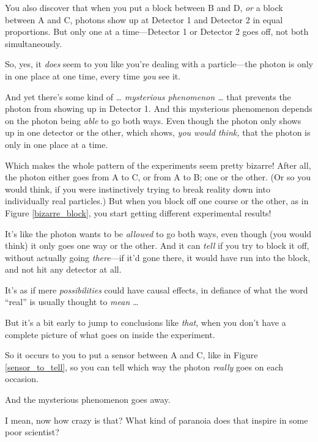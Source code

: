 {
 You also discover that when you put a block between B and D,
\textit{or} a block between A and C, photons show up at Detector 1 and
Detector 2 in equal proportions. But only one at a time---Detector 1 or
Detector 2 goes off, not both simultaneously.}

{
 So, yes, it \textit{does} seem to you like you're
dealing with a particle---the photon is only in one place at one time,
every time \textit{you} see it.}

{
 And yet there's some kind of \ldots
\textit{mysterious phenomenon \ldots} that prevents the photon from
showing up in Detector 1. And this mysterious phenomenon depends on the
photon being \textit{able} to go both ways. Even though the photon only
shows up in one detector or the other, which shows, \textit{you would
think,} that the photon is only in one place at a time.}


{
 Which makes the whole pattern of the experiments seem pretty
bizarre! After all, the photon either goes from A to C, or from A to B;
one or the other. (Or so you would think, if you were instinctively
trying to break reality down into individually real particles.) But
when you block off one course or the other, as in Figure \ref{bizarre_block}, you
start getting different experimental results!}

{
 It's like the photon wants to be \textit{allowed}
to go both ways, even though (you would think) it only goes one way or
the other. And it can \textit{tell} if you try to block it off, without
actually going \textit{there}{}---if it'd gone there,
it would have run into the block, and not hit any detector at all.}

{
 It's as if mere \textit{possibilities} could have
causal effects, in defiance of what the word
``real'' is usually thought to
\textit{mean} \ldots}

{
 But it's a bit early to jump to conclusions like
\textit{that}, when you don't have a complete picture
of what goes on inside the experiment.}


{
 So it occurs to you to put a sensor between A and C, like in
Figure \ref{sensor_to_tell}, so you can tell which way the photon \textit{really} goes
on each occasion.}

{
 And the mysterious phenomenon goes away.}

{
 I mean, now how crazy is that? What kind of paranoia does that
inspire in some poor scientist?}

